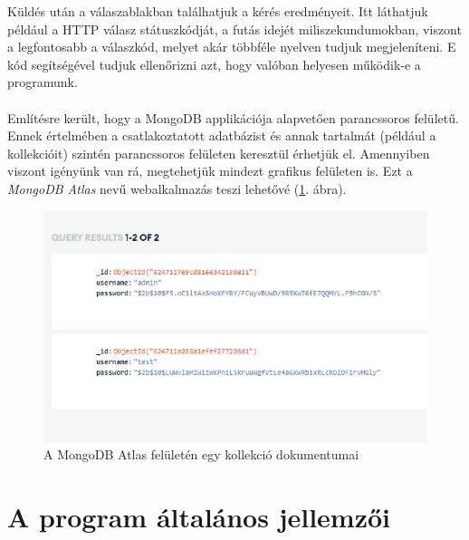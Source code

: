 Küldés után a válaszablakban találhatjuk a kérés eredményeit. Itt láthatjuk például a HTTP válasz státuszkódját, a futás idejét miliszekundumokban, viszont a legfontosabb a válaszkód, melyet akár többféle nyelven tudjuk megjeleníteni. E kód segítségével tudjuk ellenőrizni azt, hogy valóban helyesen működik-e a programunk.\\

\\

Említésre került, hogy a MongoDB applikációja alapvetően parancssoros felületű. Ennek értelmében a csatlakoztatott adatbázist és annak tartalmát (például a kollekcióit) szintén parancssoros felületen keresztül érhetjük el. Amennyiben viszont igényünk van rá, megtehetjük mindezt grafikus felületen is. Ezt a \textit{MongoDB Atlas} nevű webalkalmazás teszi lehetővé (\ref{fig:atlas}. ábra).

\newpage

\begin{figure}[h]
	\centering
		\includegraphics[width=12truecm, height=7truecm]{images/atlas.png}
	\caption{A MongoDB Atlas felületén egy kollekció dokumentumai}
	\label{fig:atlas}
\end{figure}


\section{A program általános jellemzői}

